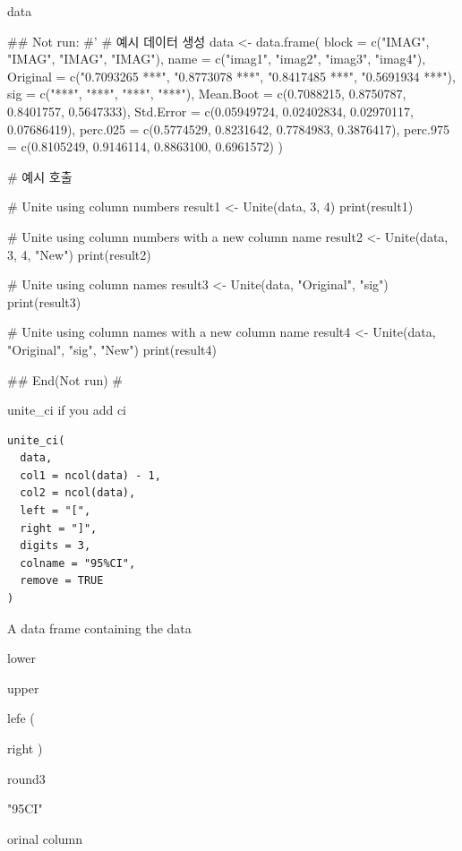 \documentclass[a4paper]{book}
\begin{document}
%
\begin{Value}
data
\end{Value}
%
\begin{Examples}
\begin{ExampleCode}
\#\# Not run: 
#'
# 예시 데이터 생성
data <- data.frame(
  block = c("IMAG", "IMAG", "IMAG", "IMAG"),
  name = c("imag1", "imag2", "imag3", "imag4"),
  Original = c("0.7093265 ***", "0.8773078 ***", "0.8417485 ***", "0.5691934 ***"),
  sig = c("***", "***", "***", "***"),
  Mean.Boot = c(0.7088215, 0.8750787, 0.8401757, 0.5647333),
  Std.Error = c(0.05949724, 0.02402834, 0.02970117, 0.07686419),
  perc.025 = c(0.5774529, 0.8231642, 0.7784983, 0.3876417),
  perc.975 = c(0.8105249, 0.9146114, 0.8863100, 0.6961572)
)

# 예시 호출

# Unite using column numbers
result1 <- Unite(data, 3, 4)
print(result1)

# Unite using column numbers with a new column name
result2 <- Unite(data, 3, 4, "New")
print(result2)

# Unite using column names
result3 <- Unite(data, "Original", "sig")
print(result3)

# Unite using column names with a new column name
result4 <- Unite(data, "Original", "sig", "New")
print(result4)



## End(Not run)
\#
\end{ExampleCode}
\end{Examples}
%
\begin{Description}
unite\_ci if you add ci
\end{Description}
%
\begin{Usage}
\begin{verbatim}
unite_ci(
  data,
  col1 = ncol(data) - 1,
  col2 = ncol(data),
  left = "[",
  right = "]",
  digits = 3,
  colname = "95%CI",
  remove = TRUE
)
\end{verbatim}
\end{Usage}
%
\begin{Arguments}
\begin{ldescription}
\item[\code{data}] A data frame containing the data

\item[\code{col1}] lower

\item[\code{col2}] upper

\item[\code{left}] lefe (

\item[\code{right}] right )

\item[\code{digits}] round3

\item[\code{colname}] "95CI"

\item[\code{remove}] orinal column
\end{ldescription}
\end{Arguments}
\end{document}
